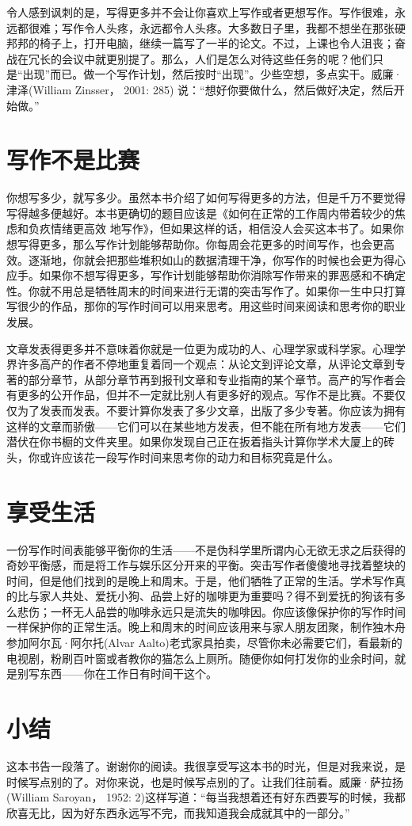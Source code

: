 令人感到讽刺的是，写得更多并不会让你喜欢上写作或者更想写作。写作很难，永远都很难；写作令人头疼，永远都令人头疼。大多数日子里，我都不想坐在那张硬邦邦的椅子上，打开电脑，继续一篇写了一半的论文。不过，上课也令人沮丧；奋战在冗长的会议中就更别提了。那么，人们是怎么对待这些任务的呢？他们只是“出现”而已。做一个写作计划，然后按时“出现”。少些空想，多点实干。威廉·津泽(William Zinsser， 2001: 285) 说：“想好你要做什么，然后做好决定，然后开始做。”





\section{写作不是比赛}
你想写多少，就写多少。虽然本书介绍了如何写得更多的方法，但是千万不要觉得写得越多便越好。本书更确切的题目应该是《如何在正常的工作周内带着较少的焦虑和负疚情绪更高效 地写作》，但如果这样的话，相信没人会买这本书了。如果你想写得更多，那么写作计划能够帮助你。你每周会花更多的时间写作，也会更高效。逐渐地，你就会把那些堆积如山的数据清理干净，你写作的时候也会更为得心应手。如果你不想写得更多，写作计划能够帮助你消除写作带来的罪恶感和不确定性。你就不用总是牺牲周末的时间来进行无谓的突击写作了。如果你一生中只打算写很少的作品，那你的写作时间可以用来思考。用这些时间来阅读和思考你的职业发展。

文章发表得更多并不意味着你就是一位更为成功的人、心理学家或科学家。心理学界许多高产的作者不停地重复着同一个观点：从论文到评论文章，从评论文章到专著的部分章节，从部分章节再到报刊文章和专业指南的某个章节。高产的写作者会有更多的公开作品，但并不一定就比别人有更多好的观点。写作不是比赛。不要仅仅为了发表而发表。不要计算你发表了多少文章，出版了多少专著。你应该为拥有这样的文章而骄傲——它们可以在某些地方发表，但不能在所有地方发表——它们潜伏在你书橱的文件夹里。如果你发现自己正在扳着指头计算你学术大厦上的砖头，你或许应该花一段写作时间来思考你的动力和目标究竟是什么。




\section{享受生活}
一份写作时间表能够平衡你的生活——不是伪科学里所谓内心无欲无求之后获得的奇妙平衡感，而是将工作与娱乐区分开来的平衡。突击写作者傻傻地寻找着整块的时间，但是他们找到的是晚上和周末。于是，他们牺牲了正常的生活。学术写作真的比与家人共处、爱抚小狗、品尝上好的咖啡更为重要吗？得不到爱抚的狗该有多么悲伤；一杯无人品尝的咖啡永远只是流失的咖啡因。你应该像保护你的写作时间一样保护你的正常生活。晚上和周末的时间应该用来与家人朋友团聚，制作独木舟参加阿尔瓦·阿尔托(Alvar Aalto)老式家具拍卖，尽管你未必需要它们，看最新的电视剧，粉刷百叶窗或者教你的猫怎么上厕所。随便你如何打发你的业余时间，就是别写东西——你在工作日有时间干这个。



\section{小结}
这本书告一段落了。谢谢你的阅读。我很享受写这本书的时光，但是对我来说，是时候写点别的了。对你来说，也是时候写点别的了。让我们往前看。威廉·萨拉扬(William Saroyan， 1952: 2)这样写道：“每当我想着还有好东西要写的时候，我都欣喜无比，因为好东西永远写不完，而我知道我会成就其中的一部分。”